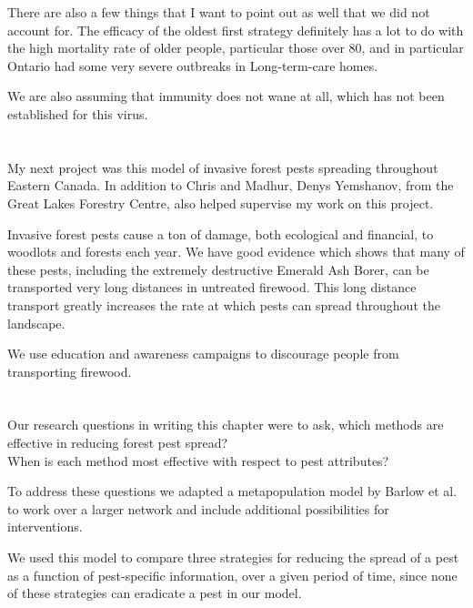 \documentclass{article}
\begin{document}
There are also a few things that I want to point out as well that we did not account for. The efficacy of the oldest first strategy definitely has a lot to do with the high mortality rate of older people, particular those over 80, and in particular Ontario had some very severe outbreaks in Long-term-care homes.

We are also assuming that immunity does not wane at all, which has not been established for this virus.

\section{}

My next project was this model of invasive forest pests spreading throughout Eastern Canada. In addition to Chris and Madhur, Denys Yemshanov, from the Great Lakes Forestry Centre, also helped supervise my work on this project. 

Invasive forest pests cause a ton of damage, both ecological and financial, to woodlots and forests each year. We have good evidence which shows that many of these pests, including the extremely destructive Emerald Ash Borer, can be transported very long distances in untreated firewood. This long distance transport greatly increases the rate at which pests can spread throughout the landscape.

We use education and awareness campaigns to discourage people from transporting firewood. 


\section{}

Our research questions in writing this chapter were to ask, which methods are effective in reducing forest pest spread? \\
\vspace{0.5cm}
When is each method most effective with respect to pest attributes? 

To address these questions we adapted a metapopulation model by Barlow et al. to work over a larger network and include additional possibilities for interventions.

We used this model to compare three strategies for reducing the spread of a pest as a function of pest-specific information, over a given period of time, since none of these strategies can eradicate a pest in our model.


\section{}
\end{document}
